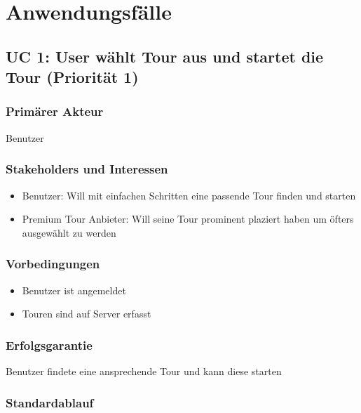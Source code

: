 \documentclass[a4paper,10pt,xetex]{article}
\begin{document}
\section{Anwendungsfälle}\label{anwendungsfuxe4lle}

\subsection{UC 1: User wählt Tour aus und startet die Tour (Priorität
1)}\label{uc-1-user-wuxe4hlt-tour-aus-und-startet-die-tour-priorituxe4t-1}

\subsubsection{Primärer Akteur}\label{primuxe4rer-akteur}

Benutzer

\subsubsection{Stakeholders und
Interessen}\label{stakeholders-und-interessen}

\begin{itemize}
\tightlist
\item
  Benutzer: Will mit einfachen Schritten eine passende Tour finden und
  starten
\item
  Premium Tour Anbieter: Will seine Tour prominent plaziert haben um
  öfters ausgewählt zu werden
\end{itemize}

\subsubsection{Vorbedingungen}\label{vorbedingungen}

\begin{itemize}
\tightlist
\item
  Benutzer ist angemeldet
\item
  Touren sind auf Server erfasst
\end{itemize}

\subsubsection{Erfolgsgarantie}\label{erfolgsgarantie}

Benutzer findete eine ansprechende Tour und kann diese starten

\subsubsection{Standardablauf}\label{standardablauf}
\end{document}
